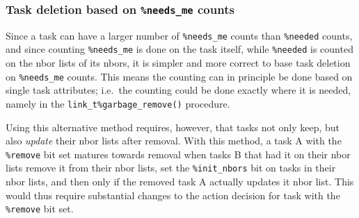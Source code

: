 \documentclass[paper=a4,fontsize=11pt]{scrartcl}
\numberwithin{equation}{section}		%
\numberwithin{figure}{section}			%
\numberwithin{table}{section}				%
\newcommand{\codecolor}{\color{Blue}}
\newcommand{\Code}[1]{{\codecolor\texttt{#1}}}
\begin{document}
\subsubsection{Task deletion based on \Code{\%needs\_me} counts}
Since a task can have a larger number of \verb|%needs_me| counts than \verb|%needed| counts, and since counting \verb|%needs_me| is done on the task itself, while \verb|%needed| is counted on the nbor lists of its nbors, it is simpler and more correct to base task deletion on \verb|%needs_me| counts.  This means the counting can in principle be done based on single task attributes; i.e.\ the counting could be done exactly where it is needed, namely in the \verb|link_t%garbage_remove()| procedure.

Using this alternative method requires, however, that tasks not only keep, but also \textit{update} their nbor lists after removal.   With this method, a task A with the \verb|%remove| bit set matures towards removal when tasks B that had it on their nbor lists remove it from their nbor lists, set the \verb|%init_nbors| bit on tasks in their nbor lists, and then only if the removed task A actually updates it nbor list.   This would thus require substantial changes to the action decision for task with the \verb|%remove| bit set.

\end{document}
